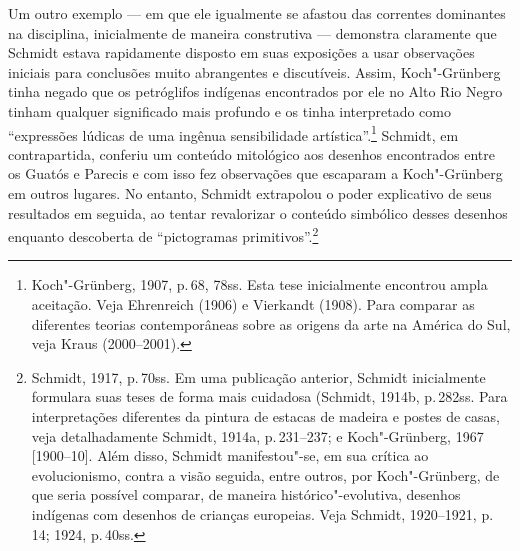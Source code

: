 Um outro exemplo --- em que ele igualmente se afastou das correntes
dominantes na disciplina, inicialmente de maneira construtiva ---
demonstra claramente que Schmidt estava rapidamente disposto em suas
exposições a usar observações iniciais para conclusões muito abrangentes
e discutíveis. Assim, Koch"-Grünberg tinha negado que os petróglifos
indígenas encontrados por ele no Alto Rio Negro tinham qualquer
significado mais profundo e os tinha interpretado como ``expressões
lúdicas de uma ingênua sensibilidade artística''.\footnote{Koch"-Grünberg,
  1907, p.\,68, 78ss. Esta tese inicialmente encontrou ampla aceitação.
  Veja Ehrenreich (1906) e Vierkandt (1908). Para comparar as
  diferentes teorias contemporâneas sobre as origens da arte na América
  do Sul, veja Kraus (2000--2001).} Schmidt, em contrapartida, conferiu
um conteúdo mitológico aos desenhos encontrados entre os Guatós e Parecis
e com isso fez observações que escaparam a Koch"-Grünberg em outros
lugares. No entanto, Schmidt extrapolou o poder explicativo de seus
resultados em seguida, ao tentar revalorizar o conteúdo simbólico
desses desenhos enquanto descoberta de ``pictogramas
primitivos''.\footnote{Schmidt, 1917, p.\,70ss. %
  Em uma publicação anterior, Schmidt inicialmente formulara suas teses
  de forma mais cuidadosa (Schmidt, 1914b, p.\,282ss. Para
  interpretações diferentes da pintura de estacas de madeira e postes de
  casas, veja detalhadamente Schmidt, 1914a, p.\,231--237; e Koch"-Grünberg,
  1967 {[}1900--10{]}. Além disso, Schmidt manifestou"-se, em sua
  crítica ao evolucionismo, contra a visão seguida, entre outros, por
  Koch"-Grünberg, de que seria possível comparar, de maneira
  histórico"-evolutiva, desenhos indígenas com desenhos de crianças
  europeias. Veja Schmidt, 1920--1921, p.\,14; 1924, p.\,40ss.}


